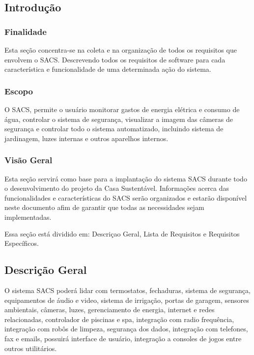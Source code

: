 \subsection{Introdução}
\subsubsection{Finalidade}
	Esta seção concentra-se na coleta e na organização de todos os requisitos que envolvem o SACS. Descrevendo todos
	os requisitos de software para cada característica e funcionalidade de uma determinada ação do sistema.

\subsubsection{Escopo}

	O SACS, permite o usuário monitorar gastos de energia elétrica e consumo de água, controlar o sistema de segurança,
	visualizar a imagem das câmeras de segurança e controlar todo o sistema automatizado, incluindo sistema de
	jardinagem, luzes internas e outros aparelhos internos.

\subsubsection{Visão Geral}

	Esta seção servirá como base para a implantação do sistema SACS durante todo o desenvolvimento do projeto da Casa
	 Sustentável. Informações acerca das funcionalidades e características do SACS serão organizados e estarão
	 disponível neste documento afim de garantir que todas as necessidades sejam implementadas.

	Essa seção está dividido em: Descriçao Geral, Lista de Requisitos e Requisitos Específicos.

\subsection{Descrição Geral}

	O sistema SACS poderá lidar com termostatos, fechaduras, sistema de segurança, equipamentos de áudio e video, sistema
	de irrigação, portas de garagem, sensores ambientais, câmeras, luzes, gerenciamento de energia, internet e
	redes relacionadas, controlador de piscinas e spa, integração com radio frequência, integração com robôs de
	limpeza, segurança dos dados, integração com telefones, fax e emails, possuirá interface de usuário, integração
	 a consoles de jogos entre outros utilitários.

